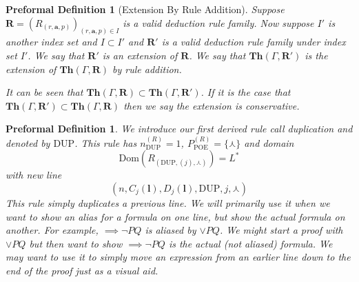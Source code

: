 \documentclass[oneside, 12pt]{book}
\theoremstyle{break}
\newtheorem{preformal definition}[definition]{Preformal Definition}
\newtheorem{preformal theorem}[theorem]{Preformal Theorem}
\newcommand{\bv}[1]{\boldsymbol{#1}}
\begin{document}
		\begin{preformal definition}[Extension By Rule Addition]
			Suppose $\bv{R} = (R_{(r, \bv{a}, p)})_{(r, \bv{a}, p) \in I}$ is a valid deduction rule family.
			Now suppose $I'$ is another index set and $I \subset I'$ and $\bv{R}'$ is a valid deduction rule family under index set $I'$.
			We say that $\bv{R}'$ is an extension of $\bv{R}$.
			We say that $\textbf{Th}(\Gamma, \bv{R}')$ is the extension of $\textbf{Th}(\Gamma, \bv{R})$ by rule addition.
			
			It can be seen that $\textbf{Th}(\Gamma, \bv{R}) \subset \textbf{Th}(\Gamma, \bv{R}')$.
			If it is the case that $\textbf{Th}(\Gamma, \bv{R}') \subset \textbf{Th}(\Gamma, \bv{R})$ then we say the extension is conservative.
		\end{preformal definition}
		
		\begin{preformal definition}
			We introduce our first derived rule call duplication and denoted by $\text{DUP}$.
			This rule has $n_{\text{DUP}}^{(R)} = 1$, $P_{\text{POE}}^{(R)} = \{\curlywedge\}$ and domain
			\begin{equation*}
				\text{Dom}(R_{(\text{DUP}, (j), \curlywedge)}) = L^*
			\end{equation*}
			with new line
			\begin{equation*}
				(n, C_j(\bv{l}), D_j(\bv{l}), \text{DUP}, j, \curlywedge)
			\end{equation*}
			This rule simply duplicates a previous line.
			We will primarily use it when we want to show an alias for a formula on one line, but show the actual formula on another.
			For example, $\implies \lnot P Q$ is aliased by $\lor PQ$.
			We might start a proof with $\lor PQ$ but then want to show $\implies \lnot P Q$ is the actual (not aliased) formula.
			We may want to use it to simply move an expression from an earlier line down to the end of the proof just as a visual aid.
		\end{preformal definition}
		
\end{document}
